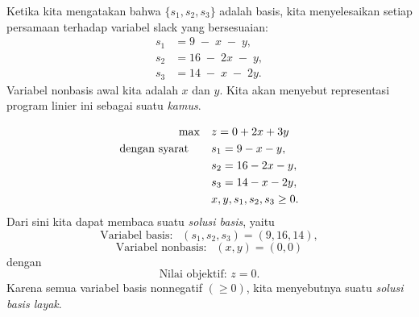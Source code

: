 Ketika kita mengatakan bahwa \(\{s_1,s_2,s_3\}\) adalah basis, kita menyelesaikan setiap persamaan terhadap variabel slack yang bersesuaian:
\[
\begin{aligned}
s_1 &= 9 \;-\; x \;-\; y, \\[6pt]
s_2 &= 16 \;-\; 2x \;-\; y,\\[6pt]
s_3 &= 14 \;-\; x \;-\; 2y.
\end{aligned}
\]
 Variabel nonbasis awal kita adalah $x$ dan $y$. 
Kita akan menyebut representasi program linier ini sebagai suatu \emph{kamus}. 
\begin{tcolorbox}[colback=blue!5!white, colframe=blue!75!black,     width=0.6\textwidth, %
    box align=center, title=\textbf{Kamus Awal}]
\[
\begin{aligned}
\max\quad 
& z = 0 + 2x + 3y \\
\mbox{dengan syarat}\quad\quad 
& s_1 = 9 - x - y, \\
& s_2 = 16 - 2x - y, \\
& s_3 = 14 - x - 2y , \\
& x, y, s_1, s_2, s_3 \ge 0.
\end{aligned}
\]
Dari sini kita dapat membaca suatu \emph{solusi basis}, yaitu 
$$
\text{Variabel basis: } \ \ (s_1, s_2, s_3) = (9, 16,14),$$
$$
 \text{Variabel nonbasis:  } \ \ (x,y) = (0,0)
$$
dengan 
$$
\text{Nilai objektif: } z = 0.
$$
Karena semua variabel basis nonnegatif $(\geq 0)$, kita menyebutnya suatu \emph{solusi basis layak}.
\end{tcolorbox}

